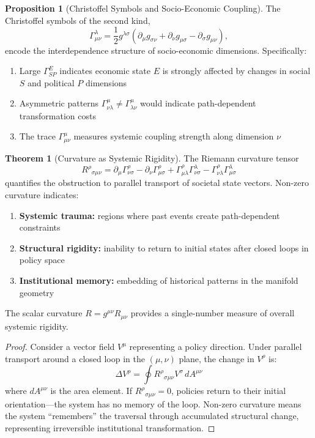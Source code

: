\documentclass[11pt,a4paper]{article}
\theoremstyle{definition}
\newtheorem{proposition}{Proposition}[section]
\newtheorem{theorem}{Theorem}[section]
\theoremstyle{remark}
\begin{document}
\begin{proposition}[Christoffel Symbols and Socio-Economic Coupling]
The Christoffel symbols of the second kind,
\[
\Gamma^\lambda_{\mu\nu} = \frac{1}{2} g^{\lambda\sigma} \left( \partial_\mu g_{\sigma\nu} + \partial_\nu g_{\mu\sigma} - \partial_\sigma g_{\mu\nu} \right),
\]
encode the interdependence structure of socio-economic dimensions. Specifically:
\begin{enumerate}[leftmargin=1.5em]
    \item Large $\Gamma^E_{SP}$ indicates economic state $E$ is strongly affected by changes in social $S$ and political $P$ dimensions
    \item Asymmetric patterns $\Gamma^\mu_{\nu\lambda} \neq \Gamma^\mu_{\lambda\nu}$ would indicate path-dependent transformation costs
    \item The trace $\Gamma^\mu_{\mu\nu}$ measures systemic coupling strength along dimension $\nu$
\end{enumerate}
\end{proposition}

\begin{theorem}[Curvature as Systemic Rigidity]
The Riemann curvature tensor
\[
R^\rho{}_{\sigma\mu\nu} = \partial_\mu \Gamma^\rho_{\nu\sigma} - \partial_\nu \Gamma^\rho_{\mu\sigma} + \Gamma^\rho_{\mu\lambda} \Gamma^\lambda_{\nu\sigma} - \Gamma^\rho_{\nu\lambda} \Gamma^\lambda_{\mu\sigma}
\]
quantifies the obstruction to parallel transport of societal state vectors. Non-zero curvature indicates:
\begin{enumerate}[leftmargin=1.5em]
    \item \textbf{Systemic trauma:} regions where past events create path-dependent constraints
    \item \textbf{Structural rigidity:} inability to return to initial states after closed loops in policy space
    \item \textbf{Institutional memory:} embedding of historical patterns in the manifold geometry
\end{enumerate}
The scalar curvature $R = g^{\mu\nu} R_{\mu\nu}$ provides a single-number measure of overall systemic rigidity.
\end{theorem}

\begin{proof}
Consider a vector field $V^\mu$ representing a policy direction. Under parallel transport around a closed loop in the $(\mu,\nu)$ plane, the change in $V^\rho$ is:
\[
\Delta V^\rho = \oint R^\rho{}_{\sigma\mu\nu} V^\sigma \, dA^{\mu\nu}
\]
where $dA^{\mu\nu}$ is the area element. If $R^\rho{}_{\sigma\mu\nu} = 0$, policies return to their initial orientation---the system has no memory of the loop. Non-zero curvature means the system ``remembers'' the traversal through accumulated structural change, representing irreversible institutional transformation.
\end{proof}
\end{document}
